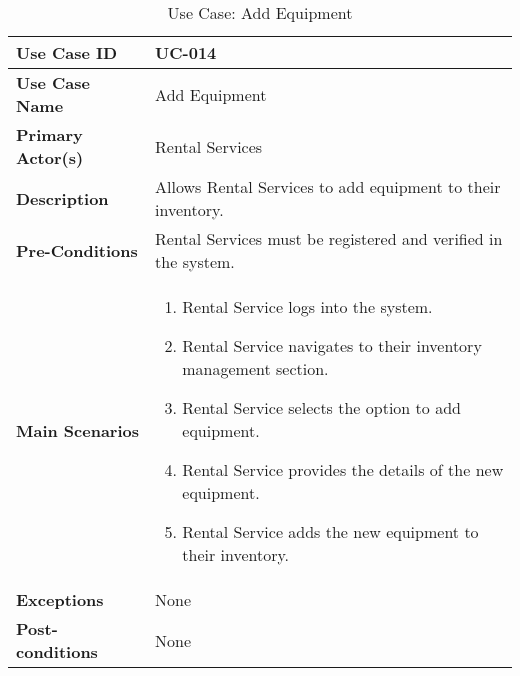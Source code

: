 \begin{table}[ht]
    \centering
    \begin{tabular}{|l|p{}|}
        \hline
        \textbf{Use Case ID} & UC-014 \\
        \hline
        \textbf{Use Case Name} & Add Equipment \\
        \hline
        \textbf{Primary Actor(s)} & Rental Services \\
        \hline
        \textbf{Description} & Allows Rental Services to add equipment to their inventory. \\
        \hline
        \textbf{Pre-Conditions} & Rental Services must be registered and verified in the system. \\
        \hline
        \textbf{Main Scenarios} & 
        \begin{enumerate}[label=\arabic*.,itemsep=0pt]
            \item Rental Service logs into the system.
            \item Rental Service navigates to their inventory management section.
            \item Rental Service selects the option to add equipment.
            \item Rental Service provides the details of the new equipment.
            \item Rental Service adds the new equipment to their inventory.
        \end{enumerate} \\
        \hline
        \textbf{Exceptions} & None \\
        \hline
        \textbf{Post-conditions} & None \\
        \hline
    \end{tabular}
    \label{tab:use-case-add-equipment}
    \caption{Use Case: Add Equipment}
\end{table}


